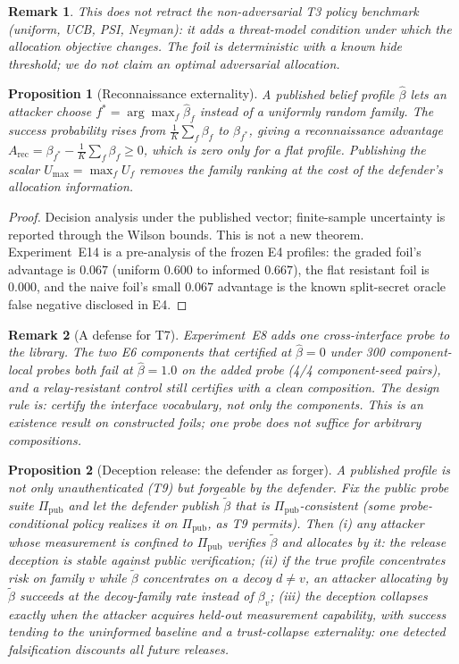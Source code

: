\documentclass[11pt]{article}
\newtheorem{proposition}{Proposition}
\newtheorem{remark}{Remark}
\begin{document}
\begin{remark}
This does not retract the non-adversarial T3 policy benchmark (uniform, UCB,
PSI, Neyman): it adds a threat-model condition under which the allocation
objective changes. The foil is deterministic with a known hide threshold; we
do not claim an optimal adversarial allocation.
\end{remark}
\begin{proposition}[Reconnaissance externality]\label{prop:t14}
A published belief profile $\hat\beta$ lets an attacker choose
$f^*=\arg\max_f\hat\beta_f$ instead of a uniformly random family. The success
probability rises from $\frac{1}{K}\sum_f\beta_f$ to $\beta_{f^*}$, giving a
reconnaissance advantage
$A_{\mathrm{rec}}=\beta_{f^*}-\frac{1}{K}\sum_f\beta_f\ge0$, which is zero only
for a flat profile. Publishing the scalar $U_{\max}=\max_f U_f$ removes the
family ranking at the cost of the defender's allocation information.
\end{proposition}
\begin{proof}
Decision analysis under the published vector; finite-sample uncertainty is
reported through the Wilson bounds. This is not a new theorem. Experiment~E14
is a pre-analysis of the frozen E4 profiles: the graded foil's advantage is
$0.067$ (uniform $0.600$ to informed $0.667$), the flat resistant foil is
$0.000$, and the naive foil's small $0.067$ advantage is the known split-secret
oracle false negative disclosed in E4.
\end{proof}
\begin{remark}[A defense for T7]
Experiment~E8 adds one cross-interface probe to the library. The two E6
components that certified at $\hat\beta=0$ under 300 component-local probes
both fail at $\hat\beta=1.0$ on the added probe (4/4 component-seed pairs), and
a relay-resistant control still certifies with a clean composition. The design
rule is: \emph{certify the interface vocabulary, not only the components}. This
is an existence result on constructed foils; one probe does not suffice for
arbitrary compositions.
\end{remark}
\begin{proposition}[Deception release: the defender as forger]\label{prop:t15}
A published profile is not only unauthenticated (T9) but forgeable by the
\emph{defender}. Fix the public probe suite $\Pi_{\mathrm{pub}}$ and let the
defender publish $\tilde\beta$ that is $\Pi_{\mathrm{pub}}$-consistent (some
probe-conditional policy realizes it on $\Pi_{\mathrm{pub}}$, as T9 permits).
Then (i) any attacker whose measurement is confined to $\Pi_{\mathrm{pub}}$
verifies $\tilde\beta$ and allocates by it: the release deception is
\emph{stable} against public verification; (ii) if the true profile
concentrates risk on family $v$ while $\tilde\beta$ concentrates on a decoy
$d\ne v$, an attacker allocating by $\tilde\beta$ succeeds at the decoy-family
rate instead of $\beta_v$; (iii) the deception collapses exactly when the
attacker acquires held-out measurement capability, with success tending to the
uninformed baseline and a \emph{trust-collapse} externality: one detected
falsification discounts all future releases.
\end{proposition}
\end{document}

